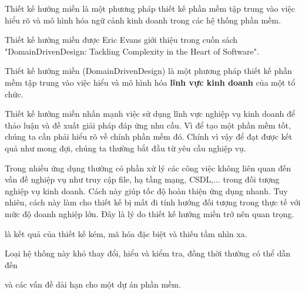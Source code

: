 Thiết kế hướng miền là một phương pháp thiết kế phần mềm tập trung vào việc hiểu rõ và mô hình hóa ngữ cảnh kinh doanh trong các hệ thống phần mềm.

Thiết kế hướng miền được Eric Evans giới thiệu trong cuốn sách "DomainDrivenDesign: Tackling Complexity in the Heart of Software".

Thiết kế hướng miền (DomainDrivenDesign) là một phương pháp thiết kế phần mềm tập trung vào việc hiểu và mô hình hóa \textbf{lĩnh vực kinh doanh} của một tổ chức.

Thiết kế hướng miền nhấn mạnh việc sử dụng lĩnh vực nghiệp vụ kinh doanh để thảo luận và đề xuất giải pháp đáp ứng nhu cầu. Vì để tạo một phần mềm tốt, chúng ta cần phải hiểu rõ về chính phần mềm đó. Chính vì vậy để đạt được kết quả như mong đợi, chúng ta thường bắt đầu từ yêu cầu nghiệp vụ.

Trong nhiều ứng dụng thường có phần xử lý các công việc không liên quan đến vấn đề nghiệp vụ như truy cập file, hạ tầng mạng, CSDL,... trong đối tượng nghiệp vụ kinh doanh. Cách này giúp tốc độ hoàn thiện ứng dụng nhanh. Tuy nhiên, cách này làm cho thiết kế bị mất đi tính hướng đối tượng trong thực tế với mức độ doanh nghiệp lớn. Đây là lý do thiết kế hướng miền trở nên quan trọng.







là kết quả của thiết kế kém, mã hóa đặc biệt và thiếu tầm nhìn xa.

Loại hệ thống này khó thay đổi, hiểu và kiểm tra, đồng thời thường có thể dẫn đến


và các vấn đề dài hạn cho một dự án phần mềm.

